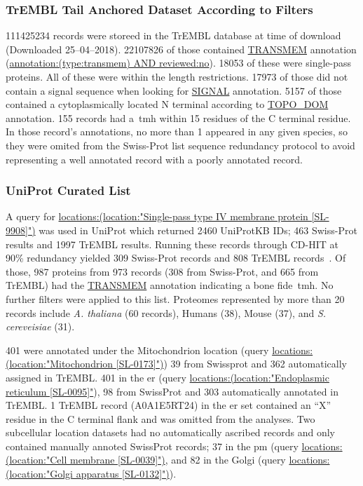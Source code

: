\subsubsection{TrEMBL Tail Anchored Dataset According to Filters}
111425234 records were storeed in the TrEMBL database at time of download (Downloaded 25--04--2018).
22107826 of those contained \url{TRANSMEM} annotation (\url{annotation:(type:transmem) AND reviewed:no}).
18053 of these were single-pass proteins.
All of these were within the length restrictions.
17973 of those did not contain a signal sequence when looking for \url{SIGNAL} annotation.
5157 of those contained a cytoplasmically located N terminal according to \url{TOPO_DOM} annotation.
155 records had a~\gls{tmh} within 15 residues of the C terminal residue.
In those record's annotations, no more than 1 appeared in any given species, so they were omited from the Swiss-Prot list sequence redundancy protocol to avoid representing a well annotated record with a poorly annotated record.

\subsubsection{UniProt Curated List}
A query for \url{locations:(location:"Single-pass type IV membrane protein [SL-9908]")} was used in UniProt which returned 2460 UniProtKB IDs; 463 Swiss-Prot results and 1997 TrEMBL results.
Running these records through CD-HIT at 90\% redundancy yielded 309 Swiss-Prot records and 808 TrEMBL records~\cite{Huang2010, Wu2011}.
Of those, 987 proteins from 973 records (308 from Swiss-Prot, and 665 from TrEMBL) had the \url{TRANSMEM} annotation indicating a bone fide~\gls{tmh}.
No further filters were applied to this list.
Proteomes represented by more than 20 records include \textit{A. thaliana} (60 records), Humans (38), Mouse (37), and \textit{S. cereveisiae} (31). %

401 were annotated under the Mitochondrion location (query \url{locations:(location:"Mitochondrion [SL-0173]")}) 39 from Swissprot and 362 automatically assigned in TrEMBL.
401 in the \gls{er} (query \url{locations:(location:"Endoplasmic reticulum [SL-0095]"}), 98 from SwissProt and 303 automatically annotated in TrEMBL.
1 TrEMBL record (A0A1E5RT24) in the \gls{er} set contained an ``X'' residue in the C terminal flank and was omitted from the analyses.
Two subcellular location datasets had no automatically ascribed records and only contained manually annoted SwissProt records; 37 in the \gls{pm} (query \url{locations:(location:"Cell membrane [SL-0039]")}, and 82 in the Golgi (query \url{locations:(location:"Golgi apparatus [SL-0132]")}).

